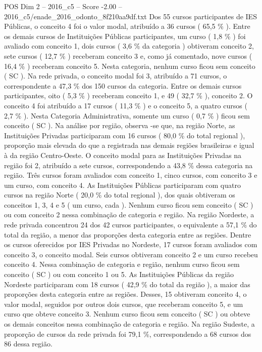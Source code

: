 \begin{textsample}{POS Dim 2 – 2016\_c5 – Score -2.00 – 2016\_c5/enade\_2016\_odonto\_8f210aa9df.txt}
Dos 55 cursos participantes de IES Públicas, o conceito 4 foi o valor modal, atribuído a 36 cursos ( 65,5 \% ).
Entre os demais cursos de Instituições Públicas participantes, um curso ( 1,8 \% ) foi avaliado com conceito 1, dois cursos ( 3,6 \% da categoria ) obtiveram conceito 2, sete cursos ( 12,7 \% ) receberam conceito 3 e, como já comentado, nove cursos ( 16,4 \% ) receberam conceito 5.
Nesta categoria, nenhum curso ficou sem conceito ( SC ).
Na rede privada, o conceito modal foi 3, atribuído a 71 cursos, o correspondente a 47,3 \% dos 150 cursos da categoria.
Entre os demais cursos participantes, oito ( 5,3 \% ) receberam conceito 1, e 49 ( 32,7 \% ), conceito 2.
O conceito 4 foi atribuído a 17 cursos ( 11,3 \% ) e o conceito 5, a quatro cursos ( 2,7 \% ).
Nesta Categoria Administrativa, somente um curso ( 0,7 \% ) ficou sem conceito ( SC ).
Na análise por região, observa -se que, na região Norte, as Instituições Privadas participaram com 16 cursos ( 80,0 \% do total regional ), proporção mais elevada do que a registrada nas demais regiões brasileiras e igual à da região Centro-Oeste.
O conceito modal para as Instituições Privadas na região foi 2, atribuído a sete cursos, correspondendo a 43,8 \% dessa categoria na região.
Três cursos foram avaliados com conceito 1, cinco cursos, com conceito 3 e um curso, com conceito 4.
As Instituições Públicas participaram com quatro cursos na região Norte ( 20,0 \% do total regional ), dos quais obtiveram os conceitos 1, 3, 4 e 5 ( um curso, cada ).
Nenhum curso ficou sem conceito ( SC ) ou com conceito 2 nessa combinação de categoria e região.
Na região Nordeste, a rede privada concentrou 24 dos 42 cursos participantes, o equivalente a 57,1 \% do total da região, a menor das proporções desta categoria entre as regiões.
Dentre os cursos oferecidos por IES Privadas no Nordeste, 17 cursos foram avaliados com conceito 3, o conceito modal.
Seis cursos obtiveram conceito 2 e um curso recebeu conceito 4.
Nessa combinação de categoria e região, nenhum curso ficou sem conceito ( SC ) ou com conceito 1 ou 5.
As Instituições Públicas da região Nordeste participaram com 18 cursos ( 42,9 \% do total da região ), a maior das proporções desta categoria entre as regiões.
Desses, 15 obtiveram conceito 4, o valor modal, seguidos por outros dois cursos, que receberam conceito 5, e um curso que obteve conceito 3.
Nenhum curso ficou sem conceito ( SC ) ou obteve os demais conceitos nessa combinação de categoria e região.
Na região Sudeste, a proporção de cursos da rede privada foi 79,1 \%, correspondendo a 68 cursos dos 86 dessa região.

\end{textsample}
